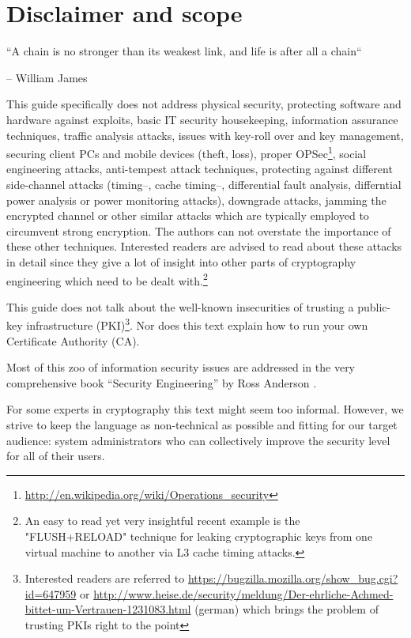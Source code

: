 \section{Disclaimer and scope}
\label{section:disclaimer}

\epigraph{``A chain is no stronger than its weakest link, and life is after all a chain``}{-- William James}


This guide specifically does not address physical security, protecting software
and hardware against exploits, basic IT security housekeeping, information
assurance techniques, traffic analysis attacks, issues with key-roll over and
key management, securing client PCs and mobile devices (theft, loss), proper
OPSec\footnote{\url{http://en.wikipedia.org/wiki/Operations_security}}, social
engineering attacks, anti-tempest\cite{Wikipedia:Tempest} attack techniques,
protecting against different side-channel attacks (timing--, cache timing--,
differential fault analysis, differntial power analysis or power monitoring
attacks), downgrade attacks, jamming the encrypted channel or other similar
attacks which are typically employed to circumvent strong encryption.  The
authors can not overstate the importance of these other techniques.  Interested
readers are advised to read about these attacks in detail since they give a lot
of insight into other parts of cryptography engineering which need to be dealt
with.\footnote{An easy to read yet very insightful recent example is the
"FLUSH+RELOAD" technique \cite{yarom2013flush+} for leaking cryptographic keys
from one virtual machine to another via L3 cache timing attacks.}

This guide does not talk about the well-known insecurities of trusting a
public-key infrastructure (PKI)\footnote{Interested readers are referred to
\url{https://bugzilla.mozilla.org/show_bug.cgi?id=647959} or
\url{http://www.heise.de/security/meldung/Der-ehrliche-Achmed-bittet-um-Vertrauen-1231083.html}
(german) which brings the problem of trusting PKIs right to the point}. Nor
does this text explain how to run your own Certificate Authority (CA). 

Most of this zoo of information security issues are addressed in the very
comprehensive book ``Security Engineering'' by Ross Anderson
\cite{anderson2008security}. 

For some experts in cryptography this text might seem too informal. However, we
strive to keep the language as non-technical as possible and fitting for our
target audience: system administrators who can collectively improve the
security level for all of their users. 



